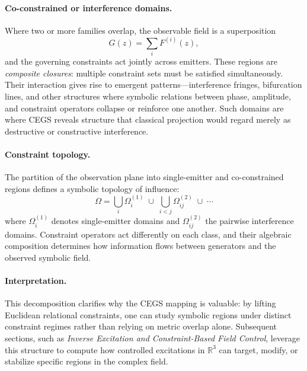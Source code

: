 \documentclass[11pt]{article}
\theoremstyle{plain}
\theoremstyle{definition}
\theoremstyle{remark}
\begin{document}
\paragraph{Co-constrained or interference domains.}
Where two or more families overlap, the observable field is a superposition
\[
G(z) = \sum_i F^{(i)}(z),
\]
and the governing constraints act jointly across emitters.
These regions are \emph{composite closures}:
multiple constraint sets must be satisfied simultaneously.
Their interaction gives rise to emergent patterns---interference fringes, bifurcation lines,
and other structures where symbolic relations between phase, amplitude, and constraint operators
collapse or reinforce one another.
Such domains are where CEGS reveals structure that classical projection
would regard merely as destructive or constructive interference.

\paragraph{Constraint topology.}
The partition of the observation plane into single-emitter and co-constrained regions
defines a symbolic topology of influence:
\[
\Omega = \bigcup_i \Omega_i^{(1)} \;\cup\; \bigcup_{i<j} \Omega_{ij}^{(2)} \;\cup\; \cdots
\]
where \(\Omega_i^{(1)}\) denotes single-emitter domains
and \(\Omega_{ij}^{(2)}\) the pairwise interference domains.
Constraint operators act differently on each class,
and their algebraic composition determines how information flows
between generators and the observed symbolic field.

\paragraph{Interpretation.}
This decomposition clarifies why the CEGS mapping is valuable:
by lifting Euclidean relational constraints, one can study symbolic regions
under distinct constraint regimes rather than relying on metric overlap alone.
Subsequent sections, such as \emph{Inverse Excitation and Constraint-Based Field Control},
leverage this structure to compute how controlled excitations in \(\mathbb{R}^3\)
can target, modify, or stabilize specific regions in the complex field.
\end{document}
